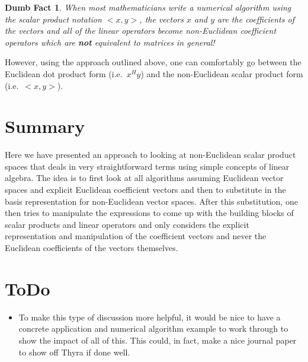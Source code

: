 \documentclass[pdf,ps2pdf,11pt]{SANDreport}
\newtheorem{dumb_fact}{Dumb Fact}[section]
\begin{document}
\begin{dumb_fact}
When most mathematicians write a numerical algorithm using the scalar product
notation $<x,y>$, the vectors $x$ and $y$ are the {}\textit{coefficients} of
the vectors and all of the linear operators become non-Euclidean coefficient
operators which are {}\textbf{not} equivalent to matrices in general!
\end{dumb_fact}

However, using the approach outlined above, one can comfortably go between the
Euclidean dot product form (i.e.\ $x^H y$) and the non-Euclidean scalar
product form (i.e.\ $<x,y>$).

\section{Summary}

Here we have presented an approach to looking at non-Euclidean scalar product
spaces that deals in very straightforward terms using simple concepts of
linear algebra.  The idea is to first look at all algorithms assuming
Euclidean vector spaces and explicit Euclidean coefficient vectors and then to
substitute in the basis representation for non-Euclidean vector spaces.  After
this substitution, one then tries to manipulate the expressions to come up
with the building blocks of scalar products and linear operators and only
considers the explicit representation and manipulation of the coefficient
vectors and never the Euclidean coefficients of the vectors themselves.

\section{ToDo}

\begin{itemize}

{}\item To make this type of discussion more helpful, it would be nice to have
a concrete application and numerical algorithm example to work through to show
the impact of all of this.  This could, in fact, make a nice journal paper to
show off Thyra if done well.

\end{itemize}

%
\clearpage



%
\appendix
%

\end{document}
